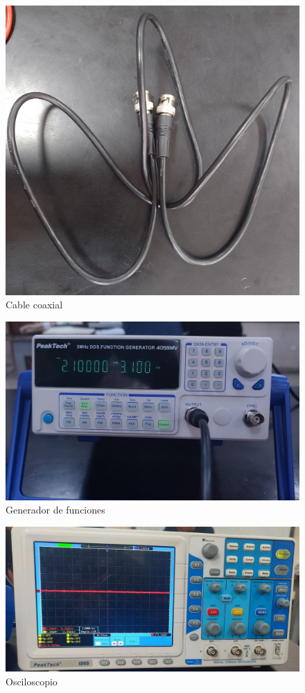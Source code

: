 \documentclass[twocolumn]{article}
\begin{document}
\begin{otherlanguage}{spanish}
\begin{figure}[H]
    \centering
    \includegraphics[width=0.6\linewidth]{Figures/figura/WhatsApp Image 2024-11-12 at 5.20.56 PM.jpeg}
    \caption{Cable coaxial}
    \label{}
\end{figure}

\begin{figure}[H]
    \centering
    \includegraphics[width=0.8\linewidth]{Figures/figura/WhatsApp Image 2024-11-13 at 4.49.30 PM.jpeg}
    \caption{Generador de funciones}
    \label{}
\end{figure}

\begin{figure}[H]
    \centering
    \includegraphics[width=0.9\linewidth]{Figures/figura/WhatsApp Image 2024-11-13 at 4.49.40 PM.jpeg}
    \caption{Osciloscopio}
    \label{}
\end{figure}


\end{otherlanguage}
\end{document}
